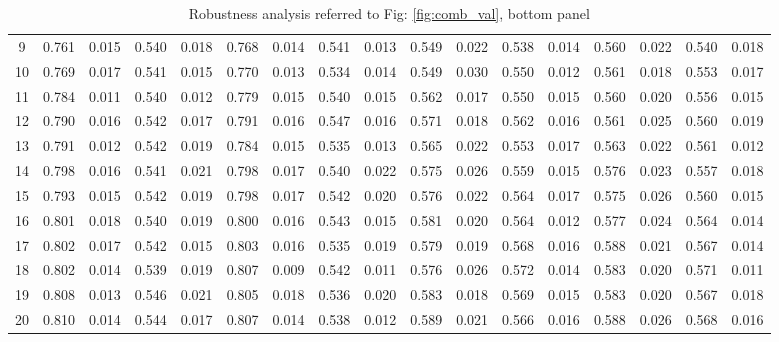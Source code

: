 \documentclass{article}
\begin{document}
\begin{table}[H]
{\begin{tabular}{|c|c|c|c|c|c|c|c|c|c|c|c|c|c|c|c|c|}
     9 & 0.761 & 0.015 & 0.540 & 0.018 & 0.768 & 0.014 & 0.541 & 0.013 & 0.549 & 0.022 & 0.538 & 0.014 & 0.560 & 0.022 & 0.540 & 0.018 \\ 
    10 & 0.769 & 0.017 & 0.541 & 0.015 & 0.770 & 0.013 & 0.534 & 0.014 & 0.549 & 0.030 & 0.550 & 0.012 & 0.561 & 0.018 & 0.553 & 0.017 \\ 
    11 & 0.784 & 0.011 & 0.540 & 0.012 & 0.779 & 0.015 & 0.540 & 0.015 & 0.562 & 0.017 & 0.550 & 0.015 & 0.560 & 0.020 & 0.556 & 0.015 \\ 
    12 & 0.790 & 0.016 & 0.542 & 0.017 & 0.791 & 0.016 & 0.547 & 0.016 & 0.571 & 0.018 & 0.562 & 0.016 & 0.561 & 0.025 & 0.560 & 0.019 \\ 
    13 & 0.791 & 0.012 & 0.542 & 0.019 & 0.784 & 0.015 & 0.535 & 0.013 & 0.565 & 0.022 & 0.553 & 0.017 & 0.563 & 0.022 & 0.561 & 0.012 \\ 
    14 & 0.798 & 0.016 & 0.541 & 0.021 & 0.798 & 0.017 & 0.540 & 0.022 & 0.575 & 0.026 & 0.559 & 0.015 & 0.576 & 0.023 & 0.557 & 0.018 \\ 
    15 & 0.793 & 0.015 & 0.542 & 0.019 & 0.798 & 0.017 & 0.542 & 0.020 & 0.576 & 0.022 & 0.564 & 0.017 & 0.575 & 0.026 & 0.560 & 0.015 \\ 
    16 & 0.801 & 0.018 & 0.540 & 0.019 & 0.800 & 0.016 & 0.543 & 0.015 & 0.581 & 0.020 & 0.564 & 0.012 & 0.577 & 0.024 & 0.564 & 0.014 \\ 
    17 & 0.802 & 0.017 & 0.542 & 0.015 & 0.803 & 0.016 & 0.535 & 0.019 & 0.579 & 0.019 & 0.568 & 0.016 & 0.588 & 0.021 & 0.567 & 0.014 \\ 
    18 & 0.802 & 0.014 & 0.539 & 0.019 & 0.807 & 0.009 & 0.542 & 0.011 & 0.576 & 0.026 & 0.572 & 0.014 & 0.583 & 0.020 & 0.571 & 0.011 \\ 
    19 & 0.808 & 0.013 & 0.546 & 0.021 & 0.805 & 0.018 & 0.536 & 0.020 & 0.583 & 0.018 & 0.569 & 0.015 & 0.583 & 0.020 & 0.567 & 0.018 \\ 
    20 & 0.810 & 0.014 & 0.544 & 0.017 & 0.807 & 0.014 & 0.538 & 0.012 & 0.589 & 0.021 & 0.566 & 0.016 & 0.588 & 0.026 & 0.568 & 0.016 \\ 
   \hline
\end{tabular}
}

\caption{Robustness analysis referred to Fig: \ref{fig:comb_val}, bottom panel}
\label{tab:comb_val_btm}
\end{table} %
\end{document}
